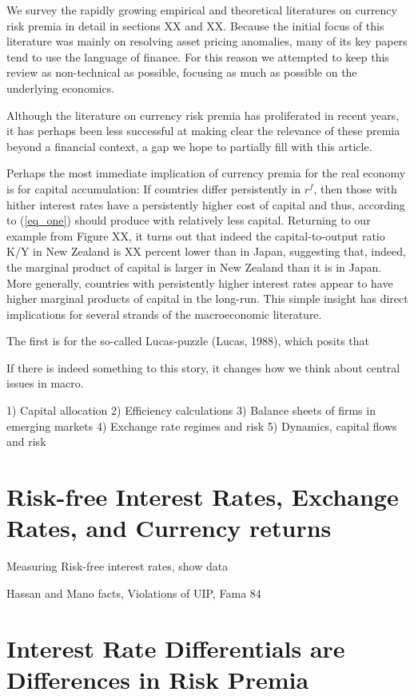 \documentclass[12pt,letter]{article}
\theoremstyle{break} \theorembodyfont{\normalfont\itshape}
\theoremstyle{break}
\theoremstyle{break} \theorembodyfont{\normalfont\itshape}
\theoremstyle{break} \theorembodyfont{\normalfont\itshape}
\begin{document}
We survey the rapidly growing empirical and theoretical literatures on currency risk premia in detail in sections XX and XX. Because the initial focus of this literature was mainly on resolving asset pricing anomalies, many of its key papers tend to use the language of finance. For this reason we attempted to keep this review as non-technical as possible, focusing as much as possible on the underlying economics.

Although the literature on currency risk premia has proliferated in recent years, it has perhaps been less successful at making clear the relevance of these premia beyond a financial context, a gap we hope to partially fill with this article. 

Perhaps the most immediate implication of currency premia for the real economy is for capital accumulation:  If countries differ persistently in $r^f$, then those with hither interest rates have a persistently higher cost of capital and thus, according to (\ref{eq_one}) should produce with relatively less capital. Returning to our example from Figure XX, it turns out that indeed the capital-to-output ratio K/Y in New Zealand is XX percent lower than in Japan, suggesting that, indeed, the marginal product of capital is larger in New Zealand than it is in Japan. More generally, countries with persistently higher interest rates appear to have higher marginal products of capital in the long-run. This simple insight has direct implications for several strands of the macroeconomic literature. 

The first is for the so-called Lucas-puzzle (Lucas, 1988), which posits that 


If there is indeed something to this story, it changes how we think
about central issues in macro.

1) Capital allocation
2) Efficiency calculations
3) Balance sheets of firms in emerging markets
4) Exchange rate regimes and risk
5) Dynamics, capital flows and risk


\section{Risk-free Interest Rates, Exchange Rates, and Currency returns}

Measuring Risk-free interest rates, show data

Hassan and Mano facts, Violations of UIP, Fama 84



\section{Interest Rate Differentials are Differences in Risk Premia}
\end{document}
